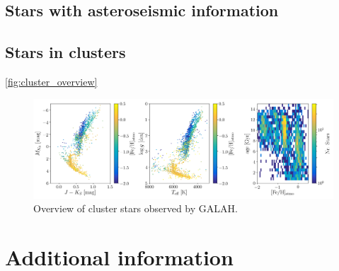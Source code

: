 \documentclass[a4paper,11pt,english]{article}
\begin{document}
\subsection{Stars with asteroseismic information}

\subsection{Stars in clusters}

\autoref{fig:cluster_overview}

\begin{figure}[!ht]
\centering
\includegraphics[width=\textwidth]{../../clusters/figures/CMD_Kiel_FehAge.png}
\caption{Overview of cluster stars observed by GALAH.}
\label{fig:cluster_overview}
\end{figure}

\section{Additional information}
\end{document}

